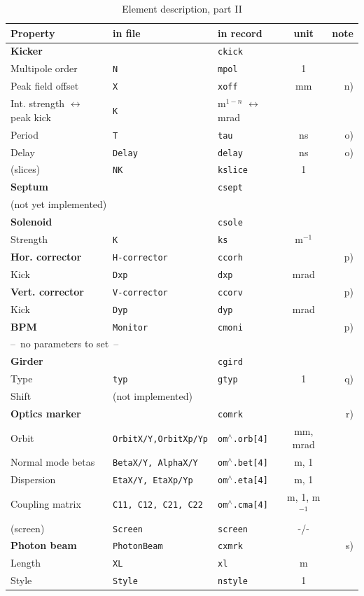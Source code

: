 \documentclass[12pt]{article}
\begin{document}
\begin{table}
\caption{\label{tabel1}Element description, part II}\vspace{1em}
\begin{tabular}{lllcr}
Property & in file & in record & unit & note \\
\hline
{\bf Kicker} & {\tt } & {\tt ckick} & &  \\
Multipole order  & {\tt N} & {\tt mpol} & 1 &  \\
Peak field offset  & {\tt X} & {\tt xoff} & mm & n)  \\
Int. strength $\leftrightarrow$ peak kick & {\tt K} & m$^{1-n}$ $\leftrightarrow$ mrad & \\
Period & {\tt T} & {\tt tau} & ns & o) \\
Delay & {\tt Delay} & {\tt delay} & ns & o) \\
(slices) & {\tt NK} & {\tt kslice} & 1 & \\
\hline
{\bf Septum} & {\tt } & {\tt csept} & &  \\
\multicolumn{5}{l}{(not yet implemented)} \\
\hline
{\bf Solenoid} & {\tt } & {\tt csole} & &  \\
Strength & {\tt K} & {\tt ks} & m$^{-1}$ &  \\
\hline
{\bf Hor. corrector} & {\tt H-corrector} & {\tt ccorh} & & p) \\
Kick & {\tt Dxp} & {\tt dxp} & mrad &   \\
\hline
{\bf Vert. corrector} & {\tt V-corrector} & {\tt ccorv} & &  p) \\
Kick & {\tt Dyp} & {\tt dyp} & mrad &   \\
\hline
{\bf BPM} & {\tt Monitor } & {\tt cmoni} & &  p) \\
\multicolumn{5}{l}{ --~no parameters to set~-- }\\
\hline
{\bf Girder} & {\tt } & {\tt cgird} & &  \\
Type & {\tt typ} & {\tt gtyp} & 1 &  q) \\
Shift & \multicolumn{4}{l}{(not implemented)} \\
\hline
{\bf Optics marker} & {\tt } & {\tt comrk} & & r) \\
Orbit & {\tt OrbitX/Y,OrbitXp/Yp} & {\tt om$^{\wedge}$.orb[4]} & mm, mrad & \\
Normal mode betas & {\tt BetaX/Y, AlphaX/Y} & {\tt om$^{\wedge}$.bet[4]} & m, 1 & \\
Dispersion & {\tt EtaX/Y, EtaXp/Yp} & {\tt om$^{\wedge}$.eta[4]} & m, 1 & \\
Coupling matrix & {\tt C11, C12, C21, C22} & {\tt om$^{\wedge}$.cma[4]} & m, 1, m$^{-1}$ & \\
(screen) & {\tt Screen} & {\tt screen} & -/- & \\
\hline
{\bf Photon beam} & {\tt PhotonBeam} & {\tt cxmrk} & &  s) \\
Length & {\tt XL} & {\tt xl} & m & \\
Style & {\tt Style} & {\tt nstyle} & 1 &  \\
\hline
\end{tabular}
\end{table}
\end{document}
